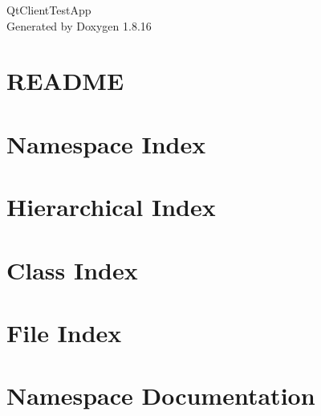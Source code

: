 \let\mypdfximage\pdfximage\def\pdfximage{\immediate\mypdfximage}\documentclass[twoside]{book}
\newcommand{\+}{\discretionary{\mbox{\scriptsize$\hookleftarrow$}}{}{}}
\newcommand{\clearemptydoublepage}{%
  \newpage{\pagestyle{empty}\cleardoublepage}%
}
\begin{document}
\hypersetup{pageanchor=false,
             bookmarksnumbered=true,
             pdfencoding=unicode
            }
\begin{titlepage}
\vspace*{7cm}
\begin{center}%
{\Large Qt\+Client\+Test\+App }\\
\vspace*{1cm}
{\large Generated by Doxygen 1.8.16}\\
\end{center}
\end{titlepage}
\clearemptydoublepage
{}
\tableofcontents
\clearemptydoublepage
{}
\hypersetup{pageanchor=true}

\chapter{R\+E\+A\+D\+ME}
\label{md__r_e_a_d_m_e}

\chapter{Namespace Index}

\chapter{Hierarchical Index}

\chapter{Class Index}

\chapter{File Index}

\chapter{Namespace Documentation}

\end{document}
